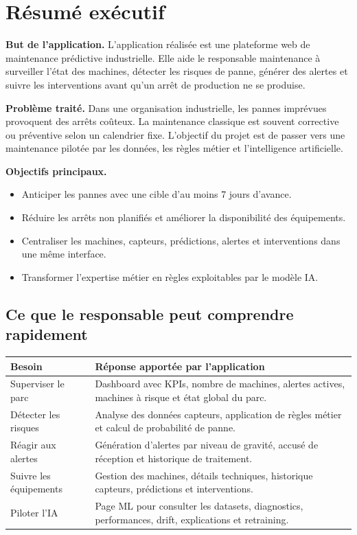 \documentclass[10pt,a4paper]{article}
\newcommand{\important}[1]{\textbf{\color{SectionColor}#1}}
\begin{document}
\setcounter{page}{1}
\small

\section{Résumé exécutif}

\important{But de l'application.}
L'application réalisée est une plateforme web de maintenance prédictive industrielle.
Elle aide le responsable maintenance à surveiller l'état des machines, détecter les risques de panne, générer des alertes et suivre les interventions avant qu'un arrêt de production ne se produise.

\vspace{0.2cm}
\important{Problème traité.}
Dans une organisation industrielle, les pannes imprévues provoquent des arrêts coûteux.
La maintenance classique est souvent corrective ou préventive selon un calendrier fixe.
L'objectif du projet est de passer vers une maintenance pilotée par les données, les règles métier et l'intelligence artificielle.

\vspace{0.2cm}
\important{Objectifs principaux.}
\begin{itemize}
  \item Anticiper les pannes avec une cible d'au moins 7 jours d'avance.
  \item Réduire les arrêts non planifiés et améliorer la disponibilité des équipements.
  \item Centraliser les machines, capteurs, prédictions, alertes et interventions dans une même interface.
  \item Transformer l'expertise métier en règles exploitables par le modèle IA.
\end{itemize}

\subsection{Ce que le responsable peut comprendre rapidement}

\begin{tabularx}{\textwidth}{p{3.2cm}Y}
\toprule
{}
\textbf{Besoin} & \textbf{Réponse apportée par l'application} \\
\midrule
Superviser le parc & Dashboard avec KPIs, nombre de machines, alertes actives, machines à risque et état global du parc. \\
Détecter les risques & Analyse des données capteurs, application de règles métier et calcul de probabilité de panne. \\
Réagir aux alertes & Génération d'alertes par niveau de gravité, accusé de réception et historique de traitement. \\
Suivre les équipements & Gestion des machines, détails techniques, historique capteurs, prédictions et interventions. \\
Piloter l'IA & Page ML pour consulter les datasets, diagnostics, performances, drift, explications et retraining. \\
\bottomrule
\end{tabularx}
\end{document}
